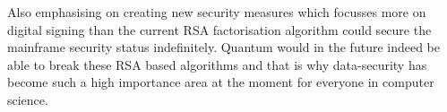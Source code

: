 Also emphasising on creating new security measures which focusses more on digital signing than the current RSA factorisation algorithm could secure the mainframe security status indefinitely. Quantum would in the future indeed be able to break these RSA based algorithms and that is why data-security has become such a high importance area at the moment for everyone in computer science.
